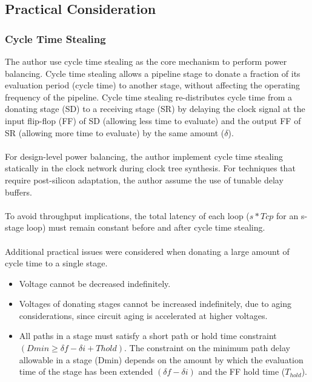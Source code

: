 \documentclass[10pt,a4paper]{article}
\begin{document}
\subsection{Practical Consideration}
\subsubsection{Cycle Time Stealing}
The author use cycle time stealing as the core mechanism to perform power balancing. Cycle time stealing allows a pipeline stage to donate a fraction of its evaluation
period (cycle time) to another stage, without affecting the operating frequency of the pipeline. Cycle time stealing re-distributes cycle time from a donating stage (SD) to a
receiving stage (SR) by delaying the clock signal at the input flip-flop (FF) of SD (allowing less time to evaluate) and the output FF of SR (allowing more time to evaluate) by the same amount ($\delta$).\\\\
For design-level power balancing, the author implement cycle time stealing statically in the clock network during clock tree synthesis. For techniques that require post-silicon
adaptation, the author assume the use of tunable delay buffers.\\\\
To avoid throughput implications, the total latency of each loop ($s \ast  Tcp$ for an
s-stage loop) must remain constant before and after cycle time stealing.\\\\
Additional practical issues were considered when donating a large amount of cycle time to a single stage.
\begin{itemize}
    \item Voltage cannot be decreased indefinitely.
    \item Voltages of donating stages cannot be increased indefinitely, due to aging considerations, since circuit aging is accelerated at higher voltages.
    \item All paths in a stage must satisfy a short path or hold time constraint
    $(Dmin ≥ \delta f - \delta i + Thold)$. The constraint on the minimum path delay allowable in a stage (Dmin) depends on the amount by which the evaluation time of the stage has been extended $(\delta f - \delta i)$ and the FF hold time ($T_{hold}$).
\end{itemize}
\end{document}
